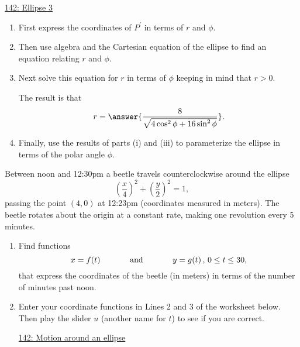 \documentclass{ximera}
\begin{document}
\begin{example}
\begin{enumerate}
\href{https://www.desmos.com/calculator/le8nhq7iwq}{142: Ellipse 3}


\begin{enumerate}
\item First express the coordinates of $P^\prime$ in terms of $r$ and $\phi$.

\item Then use algebra and the Cartesian equation of the ellipse to find an equation relating $r$ and $\phi$.

\item Next solve this equation for $r$ in terms of $\phi$ keeping in mind that $r>0$.

The result is that
\[
  r = \answer{\frac{8}{\sqrt{4\cos^2\phi + 16\sin^2\phi }}} .
\]

\item Finally, use the results of parts (i) and (iii) to parameterize the ellipse in terms of the polar angle $\phi$.
\end{enumerate}

\end{enumerate}
\end{example}

\begin{example} \label{Ex:8UDUREGDFGD}
Between noon and 12:30pm a beetle travels counterclockwise around the ellipse
\[
         \left(  \frac{x}{4} \right)^2 + \left(  \frac{y}{2} \right)^2  = 1 ,
\]
passing the point $(4,0)$ at 12:23pm (coordinates measured in meters). The beetle rotates about the origin at a constant rate, making one revolution every 5 minutes. 

\begin{enumerate}

\item Find functions
\[
    x = f(t)  \hskip 0.5 in \text{and} \hskip 0.5 in y=g(t) \, , \, 0\leq t \leq 30 ,
\]
that express the coordinates of the beetle (in meters) in terms of the number of minutes past noon.

\item Enter your coordinate functions in Lines 2 and 3 of the worksheet below. Then play the slider $u$ (another name for $t$) to see if you are correct.

\begin{onlineOnly}
    \begin{center}
\end{center}
\end{onlineOnly}

\href{https://www.desmos.com/calculator/goeo2vvdvi}{142: Motion around an ellipse}




\end{enumerate}
\end{example}
\end{document}
